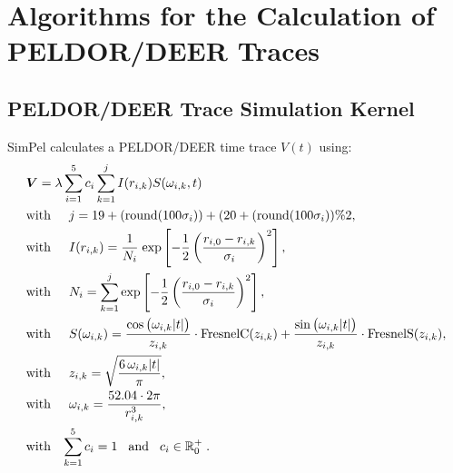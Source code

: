 \documentclass[pdftex,bezier,german,a4,twoside, headexclude,12pt,nochapterprefix, titlepage]{extarticle}
\newcommand{\simpel}{\textsf{SimPel}}
\begin{document}
\clearpage

\section{Algorithms for the Calculation of PELDOR/DEER Traces}

\subsection{PELDOR/DEER Trace Simulation Kernel}

\simpel{} calculates a PELDOR/DEER time trace $V(t)$ using:
%
\begin{align}
\begin{split}
& \boldsymbol{V}=  \lambda \sum_{i=1}^5 c_i\sum_{k=1}^{j}I(r_{i,k})S(\omega_{i,k},t) \\
&\mbox{with}\hspace{0.5cm} j =  19+(\mathrm{round}(100\sigma_i)) + (20+(\mathrm{round}(100\sigma_i))\%2,\\
&\mbox{with}\hspace{0.5cm} I(r_{i,k}) =\dfrac{1}{N_{i}} \;
\mathrm{exp}\left[-\frac{1}{2}\left(\frac{r_{i,0}-r_{i,k}}{\sigma_i}\right)^2\right],\\
&\mbox{with}\hspace{0.5cm} N_{i} = \sum_{k=1}^{j}\mathrm{exp}\left[-\frac{1}{2}\left(\frac{r_{i,0}-r_{i,k}}{\sigma_i}\right)^2\right] ,\\
&\mbox{with}\hspace{0.5cm}S(\omega_{i,k}) = 
\frac{\cos{\big(\omega_{i,k}|t| \big)}}{z_{i,k}} \cdot \text{FresnelC}(z_{i,k})  + 
   \frac{\sin{\big(\omega_{i,k} |t|\big)}}{z_{i,k}} \cdot \text{FresnelS}(z_{i,k}),\\
  &\mbox{with}\hspace{0.5cm}  z_{i,k} = \sqrt{\frac{6\,\omega_{i,k} |t| }{\pi}},\\
&\mbox{with}\hspace{0.5cm} \omega_{i,k} = \dfrac{52.04\cdot 2 \pi}{r_{i,k}^3},\\ 
&\mbox{with}\hspace{0.3cm} \sum_{k=1}^{5}c_i = 1 \hspace{0.3cm}
\mbox{and}\hspace{0.3cm}c_i \in\mathbb{R}^+_0\; .
\label{PELDOR_kernel_function}
\end{split}
\end{align}
\end{document}
